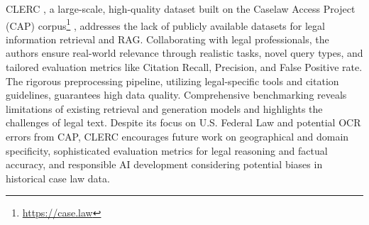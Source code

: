 
CLERC \cite{clerc}, a large-scale, high-quality dataset built on the Caselaw Access Project (CAP) corpus\footnote{\url{https://case.law}} \cite{cap}, addresses the lack of publicly available datasets for legal information retrieval and RAG. Collaborating with legal professionals, the authors ensure real-world relevance through realistic tasks, novel query types, and tailored evaluation metrics like Citation Recall, Precision, and False Positive rate. The rigorous preprocessing pipeline, utilizing legal-specific tools and citation guidelines, guarantees high data quality. Comprehensive benchmarking reveals limitations of existing retrieval and generation models and highlights the challenges of legal text. Despite its focus on U.S. Federal Law and potential OCR errors from CAP, CLERC encourages future work on geographical and domain specificity, sophisticated evaluation metrics for legal reasoning and factual accuracy, and responsible AI development considering potential biases in historical case law data.


